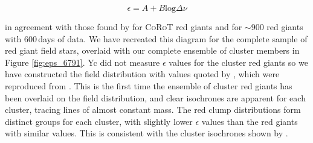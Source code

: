 \begin{equation}
    \epsilon = A + B \mathrm{log}\Delta\nu
\end{equation}

\noindent in agreement with those found by \cite{mosser_universal_2011} for \textsc{CoRoT} red giants and \cite{kallinger_evolutionary_2012} for $\sim$900 \Kepler{} red giants with 600\,days of data. We have recreated this diagram for the complete sample of \Kepler{} red giant field stars, overlaid with our complete ensemble of cluster members in Figure \ref{fig:eps_6791}. Yc did not measure $\epsilon$ values for the cluster red giants so we have constructed the field distribution with values quoted by \cite{hon_deep_2018}, which were reproduced from \cite{stello_suppression_2016}.  This is the first time the ensemble of cluster red giants has been overlaid on the field distribution, and clear isochrones are apparent for each cluster, tracing lines of almost constant mass. The red clump distributions form distinct groups for each cluster, with slightly lower $\epsilon$ values than the red giants with similar \dnu{} values. This is consistent with the cluster isochrones shown by \cite{corsaro_asteroseismology_2012}.

